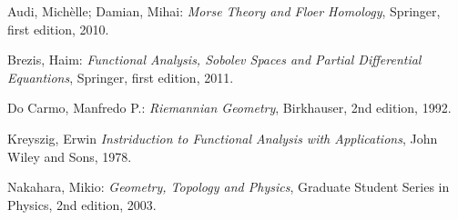 \documentclass[12pt]{book}
\begin{document}
	\begin{thebibliography}{9}
		Audi, Michèlle; Damian, Mihai:
		\emph{Morse Theory and Floer Homology},
		Springer, first edition,
		2010.
		
		Brezis, Haim:
		\emph{Functional Analysis, Sobolev Spaces and Partial Differential Equantions},
		Springer, first edition,
		2011.
		
		Do Carmo, Manfredo P.:
		\emph{Riemannian Geometry},
		Birkhauser, 2nd edition,
		1992.
	
		Kreyszig, Erwin
		\emph{Instriduction to Functional Analysis with Applications},
		John Wiley and Sons, 1978.
	
		Nakahara, Mikio:
		\emph{Geometry, Topology and Physics},
		Graduate Student Series in Physics, 2nd edition,
		2003.	
	\end{thebibliography}
	
\end{document}
